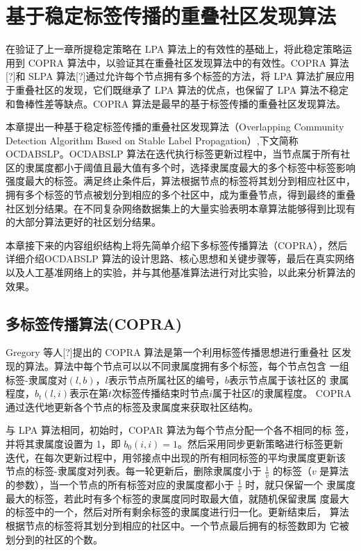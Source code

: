 \chapter{基于稳定标签传播的重叠社区发现算法}
在验证了上一章所提稳定策略在 LPA 算法上的有效性的基础上，将此稳定策略运用到 COPRA 算法中，以验证其在重叠社区发现算法中的有效性。COPRA 算法[?]和 SLPA 算法[?]通过允许每个节点拥有多个标签的方法，将 LPA 算法扩展应用于重叠社区的发现，它们既继承了 LPA 算法的优点，也保留了 LPA 算法不稳定和鲁棒性差等缺点。COPRA 算法是最早的基于标签传播的重叠社区发现算法。

本章提出一种基于稳定标签传播的重叠社区发现算法（Overlapping Community Detection Algorithm Based on Stable Label Propagation）,下文简称 OCDABSLP。OCDABSLP 算法在迭代执行标签更新过程中，当节点属于所有社区的隶属度都小于阈值且最大值有多个时，选择隶属度最大的多个标签中标签影响强度最大的标签。满足终止条件后，算法根据节点的标签将其划分到相应社区中，拥有多个标签的节点被划分到相应的多个社区中，成为重叠节点，得到最终的重叠社区划分结果。在不同复杂网络数据集上的大量实验表明本章算法能够得到比现有的大部分算法更好的社区划分结果。

本章接下来的内容组织结构上将先简单介绍下多标签传播算法（COPRA），然后详细介绍OCDABSLP 算法的设计思路、核心思想和关键步骤等，最后在真实网络以及人工基准网络上的实验，并与其他基准算法进行对比实验，以此来分析算法的效果。

\section{多标签传播算法(COPRA)}

Gregory 等人[?]提出的 COPRA 算法是第一个利用标签传播思想进行重叠社
区发现的算法。算法中每个节点可以以不同隶属度拥有多个标签，每个节点包含
一组标签-隶属度对$(l, b)$，$l $表示节点所属社区的编号，$b $表示节点属于该社区的
隶属程度，$b_t(l, i)$表示在第$ t $次标签传播结束时节点$ i $属于社区$ l $的隶属程度。
COPRA 通过迭代地更新各个节点的标签及隶属度来获取社区结构。

与 LPA 算法相同，初始时，COPAR 算法为每个节点分配一个各不相同的标
签，并将其隶属度设置为 1，即 $b_0(i, i) = 1$。然后采用同步更新策略进行标签更新
迭代，在每次更新过程中，用邻接点中出现的所有相同标签的平均隶属度更新该
节点的标签-隶属度对列表。每一轮更新后，删除隶属度小于 $\frac{1}{v}$ 的标签（$v$ 是算法的参数），当一个节点的所有标签对应的隶属度都小于 $\frac{1}{v}$ 时，就只保留一个
隶属度最大的标签，若此时有多个标签的隶属度同时取最大值，就随机保留隶属
度最大的标签中的一个，然后对所有剩余标签的隶属度进行归一化。更新结束后，
算法根据节点的标签将其划分到相应的社区中。一个节点最后拥有的标签数即为
它被划分到的社区的个数。 

